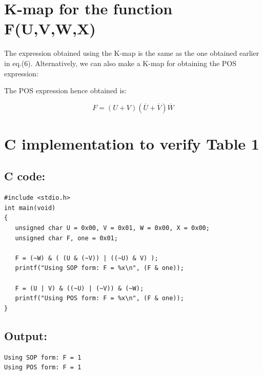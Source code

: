 \documentclass{article}
\begin{document}
\pagebreak{}

\section{K-map for the function F(U,V,W,X)}
\hspace{2cm}
\begin{figure}[h]
\centering

\end{figure}

The expression obtained using the K-map is the same as the one obtained earlier in eq.(6). Alternatively, we can also make a K-map for obtaining the POS expression:

\hspace{2cm}

\begin{figure}[h]
\centering

\end{figure}

The POS expression hence obtained is:

\begin{equation}
    F = (U+V)(\overline{U}+\overline{V})\overline{W}
\end{equation}

\pagebreak{}

\section{C implementation to verify Table 1}
\subsection{C code:}
\begin{lstlisting}[style=CStyle]
#include <stdio.h>
int main(void)
{
   unsigned char U = 0x00, V = 0x01, W = 0x00, X = 0x00;
   unsigned char F, one = 0x01;
   
   F = (~W) & ( (U & (~V)) | ((~U) & V) );
   printf("Using SOP form: F = %x\n", (F & one));
   
   F = (U | V) & ((~U) | (~V)) & (~W);
   printf("Using POS form: F = %x\n", (F & one));
}
\end{lstlisting}
\subsection{Output:}
\begin{lstlisting}[style=CStyle]
Using SOP form: F = 1
Using POS form: F = 1
\end{lstlisting}

\hline
\end{document}
